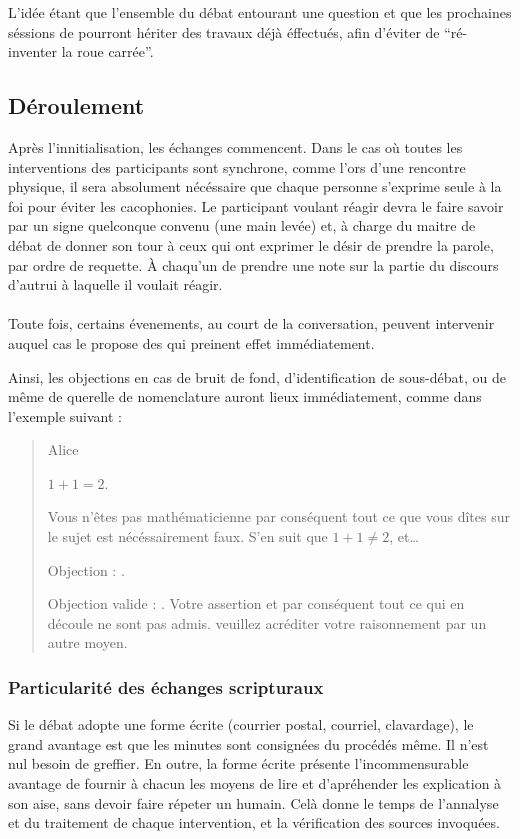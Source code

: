 L’idée étant que l’ensemble du débat entourant une question et que les prochaines séssions de \mainabbr{} pourront hériter des travaux déjà éffectués, afin d’éviter de \enquote{ré-inventer la roue carrée}.
\subsection{Déroulement}
Après l’innitialisation, les échanges commencent. Dans le cas où toutes les interventions des participants sont synchrone, comme l’ors d’une rencontre physique, il sera absolument nécéssaire que chaque personne s’exprime seule à la foi pour éviter les cacophonies. Le participant voulant réagir devra le faire savoir par un signe quelconque convenu (une main levée) et, à charge du maitre de débat de donner son tour à ceux qui ont exprimer le désir de prendre la parole, par ordre de requette. À chaqu’un de prendre une note sur la partie du discours d’autrui à laquelle il voulait réagir.

\paragraph{}
Toute fois, certains évenements, au court de la conversation, peuvent intervenir auquel cas le \mainabbr{} propose des  qui preinent effet immédiatement.

Ainsi, les objections en cas de bruit de fond, d’identification de sous-débat, ou de même de querelle de nomenclature auront lieux immédiatement, comme dans l’exemple suivant :
\begin{quote}
  \begin{drama}{0cm}{0cm}{Alice}

    \Aspeaks       $1+1=2$.

    \Bspeaks       Vous n’êtes pas mathématicienne par conséquent tout ce que vous dîtes sur le sujet est nécéssairement faux. S’en suit que $1+1\neq2$, et…

    \Aspeaks       Objection : .

    \Arbitrespeaks Objection valide : \B. Votre assertion et par conséquent tout ce qui en découle ne sont pas admis. veuillez acréditer votre raisonnement par un autre moyen.

  \end{drama}
\end{quote}

\subsubsection{Particularité des échanges scripturaux}
Si le débat adopte une forme écrite (courrier postal, courriel, clavardage), le grand avantage est que les minutes sont consignées du procédés même. Il n’est nul besoin de greffier. En outre, la forme écrite présente l’incommensurable avantage de fournir à chacun les moyens de lire et d’apréhender les explication à son aise, sans devoir faire répeter un humain. Celà donne le temps de l’annalyse et du traitement de chaque intervention, et la vérification des sources invoquées.

